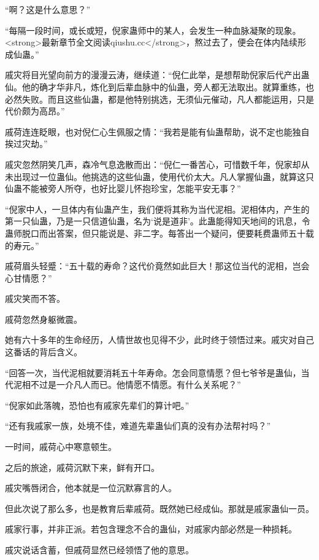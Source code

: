 
\begin{this_body}

“啊？这是什么意思？”

“每隔一段时间，或长或短，倪家蛊师中的某人，会发生一种血脉凝聚的现象。<strong>最新章节全文阅读qiushu.cc</strong>，熬过去了，便会在体内陆续形成仙蛊。”

戚灾将目光望向前方的漫漫云涛，继续道：“倪仁此举，是想帮助倪家后代产出蛊仙。他的确才华非凡，炼化到后辈血脉中的仙蛊，旁人都无法取出。就算重练，也必然失败。而且这些仙蛊，都是他特别挑选，无须仙元催动，凡人都能运用，只是代价颇为高昂。”

戚荷连连眨眼，也对倪仁心生佩服之情：“我若是能有仙蛊帮助，说不定也能独自挨过灾劫。”

戚灾忽然阴笑几声，森冷气息逸散而出：“倪仁一番苦心，可惜数千年，倪家却从未出现过一位蛊仙。他挑选的这些仙蛊，使用代价太大。凡人掌握仙蛊，就算这只仙蛊不能被旁人所夺，也好比婴儿怀抱珍宝，怎能平安无事？”

“倪家中人，一旦体内有仙蛊产生，我们便将其称为当代泥相。泥相体内，产生的第一只仙蛊，乃是一只信道仙蛊，名为‘说是道非’。此蛊能得知天地间的讯息，令蛊师脱口而出答案，但只能说是、非二字。每答出一个疑问，便要耗费蛊师五十载的寿元。”

戚荷眉头轻蹙：“五十载的寿命？这代价竟然如此巨大！那这位当代的泥相，岂会心甘情愿？”

戚灾笑而不答。

戚荷忽然身躯微震。

她有六十多年的生命经历，人情世故也见得不少，此时终于领悟过来。戚灾对自己这番话的背后含义。

“回答一次，当代泥相就要消耗五十年寿命。怎会同意情愿？但七爷爷是蛊仙，当代泥相不过是一介凡人而已。他情愿不情愿。有什么关系呢？”

“倪家如此落魄，恐怕也有戚家先辈们的算计吧。”

“还有我戚家一族，处境不佳，难道先辈蛊仙们真的没有办法帮衬吗？”

一时间，戚荷心中寒意顿生。

之后的旅途，戚荷沉默下来，鲜有开口。

戚灾嘴唇闭合，他本就是一位沉默寡言的人。

但此次说了那么多，也是教育后辈戚荷。既然她已经成仙。那就是戚家蛊仙一员。

戚家行事，并非正派。若包含理念不合的蛊仙，对戚家内部必然是一种损耗。

戚灾说话含蓄，但戚荷显然已经领悟了他的意思。


\end{this_body}
